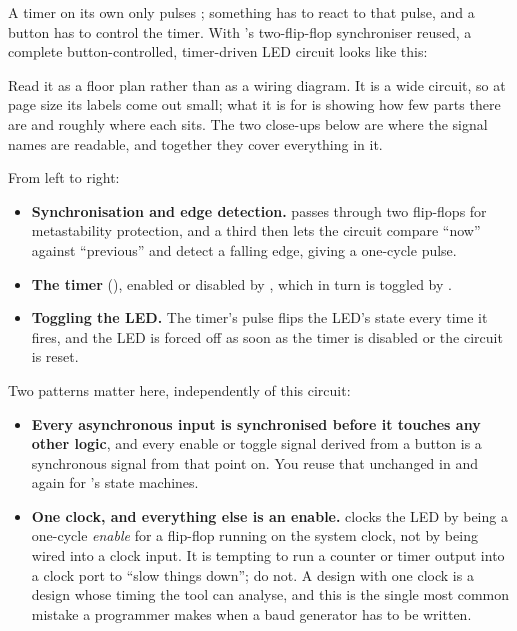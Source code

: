 A timer on its own only pulses ; something has to react to that pulse, and a button
has to control the timer. With 's two-flip-flop synchroniser reused, a complete
button-controlled, timer-driven LED circuit looks like this:


Read it as a floor plan rather than as a wiring diagram. It is a wide circuit, so at page size its
labels come out small; what it is for is showing how few parts there are and roughly where each
sits. The two close-ups below are where the signal names are readable, and together they cover
everything in it.

From left to right:
\begin{itemize}
  \item \textbf{Synchronisation and edge detection.}  passes through two flip-flops
    for metastability protection, and a third then lets the circuit compare ``now'' against
    ``previous'' and detect a falling edge, giving a one-cycle  pulse.
  \item \textbf{The timer} (), enabled or disabled by ,
    which in turn is toggled by .
  \item \textbf{Toggling the LED.} The timer's  pulse flips the LED's state every time
    it fires, and the LED is forced off as soon as the timer is disabled or the circuit is reset.
\end{itemize}



Two patterns matter here, independently of this circuit:
\begin{itemize}
  \item \textbf{Every asynchronous input is synchronised before it touches any other logic}, and
    every enable or toggle signal derived from a button is a synchronous signal from that point on.
    You reuse that unchanged in  and again for 's state
    machines.
  \item \textbf{One clock, and everything else is an enable.}  clocks the LED by being
    a one-cycle \emph{enable} for a flip-flop running on the system clock, not by being wired into a
    clock input. It is tempting to run a counter or timer output into a clock port to ``slow things
    down''; do not. A design with one clock is a design whose timing the tool can analyse, and this
    is the single most common mistake a programmer makes when a baud generator has to be written.
\end{itemize}

